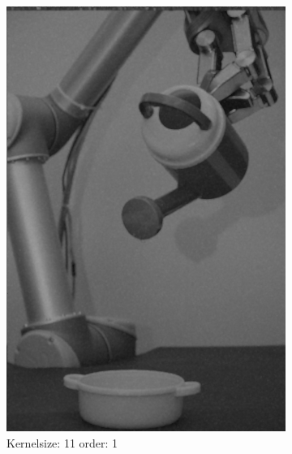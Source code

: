 \begin{figure}[H]
       \begin{subfigure}[b]{0.30\textwidth}
        \includegraphics[width=\textwidth]{img1/img_1_gaus_11_1.png}
        \caption{Kernelsize: 11 order: 1}
         \label{fig:img1_contra11_1}
    \end{subfigure}
    \begin{subfigure}[b]{0.30\textwidth}

\end{subfigure}
\end{figure}

